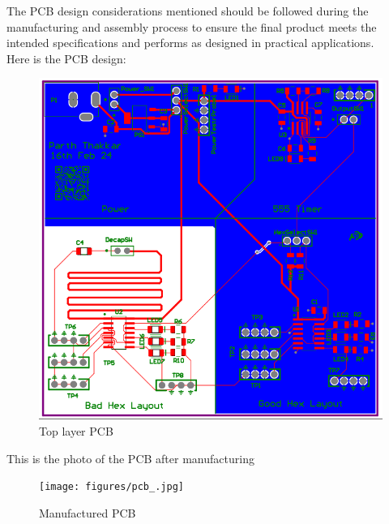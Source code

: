 \documentclass[a4paper,11pt]{article}%
\begin{document}
The PCB design considerations mentioned should be followed during the manufacturing and assembly process to ensure the final product meets the intended specifications and performs as designed in practical applications.\\

Here is the PCB design:\\

\begin{figure}[H]
	\centering
	\includegraphics[scale=0.4]{figures/pcb_color.png}
	\caption{Top layer PCB}
	\label{top}
\end{figure}

This is the photo of the PCB after manufacturing\\

\begin{figure}[H]
	\centering
	\texttt{[image: figures/pcb\_.jpg]}
	\caption{Manufactured PCB}
\end{figure}
\end{document}
